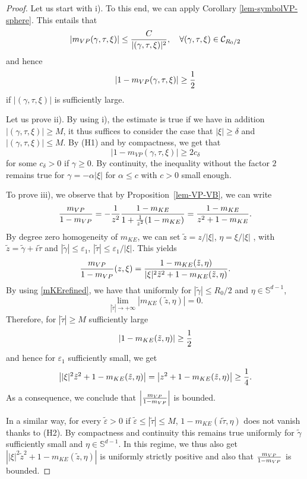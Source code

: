 \documentclass[11pt]{amsart}
\numberwithin{equation}{section}
\newcommand{\eps}{\varepsilon}
\begin{document}
\begin{proof}
Let us start with i).
 To this end, we can apply Corollary \ref{lem-symbolVP-sphere}.  This entails that 
 $$| m_{VP} (\gamma, \tau, \xi) | \leq { C \over |(\gamma, \tau, \xi) |^2}, \quad \forall (\gamma, \tau, \xi) \in \mathcal{C}_{R_{0}/2}$$
and hence 
$$|1-m_{VP}(\gamma,\tau,\xi) | \geq { 1 \over 2}$$
if $|(\gamma, \tau, \xi)|$ is sufficiently large.

Let us prove ii).  By using i), the estimate is true if we have in addition $|(\gamma, \tau, \xi)| \geq M$, it thus suffices
 to consider the case that $ |\xi| \geq  \delta$ and  $|(\gamma, \tau, \xi)| \leq M$.
  By (H1) and by compactness, we get that
   $$ | 1 - m_{VP}(\gamma, \tau, \xi)| \geq  2 c_{\delta}$$
   for some $c_{\delta}>0$ if $\gamma \geq 0$. By continuity, the inequality without the factor $2$ remains true for $\gamma  = -  \alpha | \xi|$ for $\alpha \leq  c$
    with $c>0$ small enough.

To prove iii), we observe that 
by Proposition~\ref{lem-VP-VB}, we can write
\begin{equation}
\label{expiii2} {m_{VP} \over 1- m_{VP}} = - { 1 \over z^2} { 1- m_{KE} \over  1 + { 1 \over z^2}(1-m_{KE})}
 =  { 1 -m_{KE} \over  z^2 + 1- m_{KE}}.
 \end{equation}
   By degree zero homogeneity of $m_{KE}$, we can set $\tilde z =z/ |\xi|$, $\eta= \xi/|\xi|$ , with $\tilde z= \tilde \gamma + i \tilde \tau$
    and  $| \tilde \gamma| \leq \eps_{1}$, $|\tilde \tau| \leq \eps_{1}/|\xi|$.
  This yields
$${m_{VP} \over 1- m_{VP}} (z, \xi)=  { 1- m_{KE}(\tilde z, \eta) \over  |\xi|^2 \tilde z^2  +  1- m_{KE}(\tilde z, \eta)}.$$ 
 By using  \eqref{mKErefined}, we have that  uniformly for  $| \tilde \gamma| \leq  R_{0}/2$ and $\eta \in \mathbb{S}^{d-1}$, 
 $$ \lim_{|\tilde \tau| \rightarrow + \infty} |m_{KE}(\tilde z, \eta)| = 0.$$
   Therefore, for $|\tilde \tau| \geq M$ sufficiently large 
   $$ |1- m_{KE}(\tilde z, \eta)| \geq {1 \over 2}$$
   and hence for $\eps_{1}$  sufficiently small, we get
$$\left|  |\xi|^2 \tilde z^2  +  1- m_{KE}(\tilde z, \eta)  \right| = \left|  z^2  +  1- m_{KE}(\tilde z, \eta)  \right|  \geq {1 \over 4}.$$
As a consequence, we conclude that  $\left|{m_{VP} \over 1- m_{VP}}\right|$ is bounded.

In a similar way, for every $\tilde \eps >0$ if $ \tilde \eps \leq |\tilde  \tau | \leq M$, $1-m_{KE}(i\tilde \tau, \eta)$ does not vanish
thanks to (H2). By compactness and continuity this remains  true uniformly for $\tilde \gamma$ sufficiently small
 and $\eta \in \mathbb{S}^{d-1}.$ In this regime, we thus also get 
  $\left|  |\xi|^2 \tilde z^2  +  1- m_{KE}(\tilde z, \eta)  \right|$ is uniformly strictly positive  
 and  also   that  ${m_{VP} \over 1- m_{VP}}$ is bounded. 
   

\end{proof}
\end{document}
